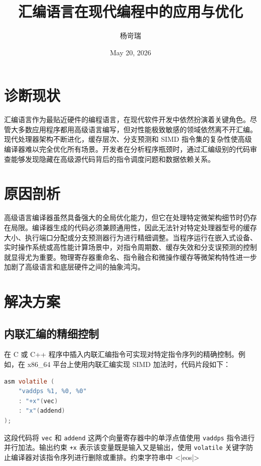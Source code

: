 \title{汇编语言在现代编程中的应用与优化}
\author{杨岢瑞}
\date{May 20, 2026}
\maketitle
\chapter{诊断现状}
汇编语言作为最贴近硬件的编程语言，在现代软件开发中依然扮演着关键角色。尽管大多数应用程序都用高级语言编写，但对性能极致敏感的领域依然离不开汇编。现代处理器架构不断进化，缓存层次、分支预测和 SIMD 指令集的复杂性使高级编译器难以完全优化所有场景。开发者在分析程序瓶颈时，通过汇编级别的代码审查能够发现隐藏在高级源代码背后的指令调度问题和数据依赖关系。\par
\chapter{原因剖析}
高级语言编译器虽然具备强大的全局优化能力，但它在处理特定微架构细节时仍存在局限。编译器生成的代码必须兼顾通用性，因此无法针对特定处理器型号的缓存大小、执行端口分配或分支预测器行为进行精细调整。当程序运行在嵌入式设备、实时操作系统或高性能计算场景中，对指令周期数、缓存失效和分支误预测的控制就显得尤为重要。物理寄存器重命名、指令融合和微操作缓存等微架构特性进一步加剧了高级语言和底层硬件之间的抽象鸿沟。\par
\chapter{解决方案}
\section{内联汇编的精细控制}
在 C 或 C++ 程序中插入内联汇编指令可实现对特定指令序列的精确控制。例如，在 x86\_{}64 平台上使用内联汇编实现 SIMD 加法时，代码片段如下：\par
\begin{lstlisting}[language=c]
asm volatile (
    "vaddps %1, %0, %0"
    : "+x"(vec)
    : "x"(addend)
);
\end{lstlisting}
这段代码将 \texttt{vec} 和 \texttt{addend} 这两个向量寄存器中的单浮点值使用 \texttt{vaddps} 指令进行并行加法。输出约束 \texttt{+x} 表示该变量既是输入又是输出，使用 \texttt{volatile} 关键字防止编译器对该指令序列进行删除或重排。约束字符串中 <|eos|>\par
